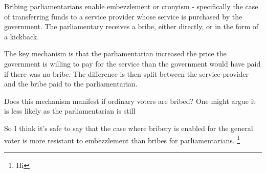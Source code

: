 Bribing parliamentarians enable embezzlement or cronyism - specifically the case of transferring funds to a service provider whose service is purchased by the government. The parliamentary receives a bribe, either directly, or in the form of a kickback.

The key mechanism is that the parliamentarian increased the price the government is willing to pay for the service than the government would have paid if there was no bribe. The difference is then split between the service-provider and the bribe paid to the parliamentarian.

Does this mechanism manifest if ordinary voters are bribed? One might argue it is less likely as the parliamentarian is still

So I think it's safe to say that the case where bribery is enabled for the general voter is more resistant to embezzlement than bribes for parliamentarians. \footnote{Hi}